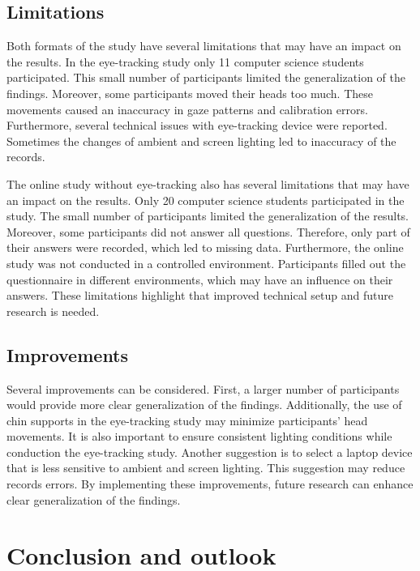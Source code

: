 \section{Limitations} 
Both formats of the study have several limitations that may have an impact on the results.
In the eye-tracking study only 11 computer science students participated.  This small number of participants limited the generalization of the findings.  Moreover, some participants moved their heads too much.  These movements caused an inaccuracy in gaze patterns and calibration errors. Furthermore, several technical issues with eye-tracking device were reported. Sometimes the changes of ambient and screen lighting led to inaccuracy of the records.


The online study without eye-tracking also has several limitations that may have an impact on the results. 
Only 20 computer science students participated in the study. The small number of participants limited the generalization of the results. 
Moreover, some participants did not answer all questions. Therefore, only part of their answers were recorded, which led to missing data. 
Furthermore, the online study was not conducted in a controlled environment. Participants filled out the questionnaire in different environments, which may have an influence on their answers.  
These limitations highlight that improved technical setup and future research is needed. 


\section{Improvements}

Several improvements can be considered. First, a larger number of participants would provide more clear generalization of the findings. Additionally, the use of chin supports in the eye-tracking study may minimize participants’ head movements. It is also important to ensure consistent lighting conditions while conduction the eye-tracking study. Another suggestion is to select a laptop device that is less sensitive to ambient and screen lighting. This suggestion may reduce records errors. By implementing these improvements, future research can enhance clear generalization of the findings. 



\chapter{Conclusion and outlook}
\label{sec:conclusion}

